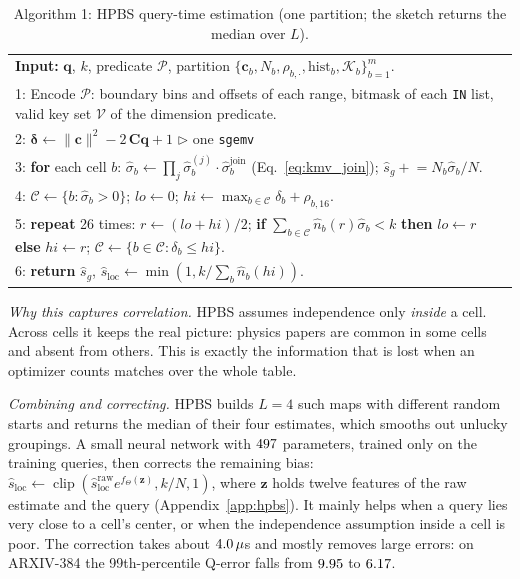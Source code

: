 \documentclass[sigconf,nonacm]{acmart}
\begin{document}
\begin{table}[!t]
\footnotesize
\centering
\caption{Algorithm 1: HPBS query-time estimation (one partition; the sketch returns the median over $L$).}
\label{alg:hpbs}
\begin{tabular}{p{}}
\toprule
\textbf{Input:} $\mathbf{q}$, $k$, predicate $\mathcal{P}$, partition $\{\mathbf{c}_b, N_b, \rho_{b,\cdot}, \text{hist}_b, \mathcal{K}_b\}_{b=1}^m$.\\
1: Encode $\mathcal{P}$: boundary bins and offsets of each range, bitmask of each \texttt{IN} list, valid key set $\mathcal{V}$ of the dimension predicate.\\
2: $\boldsymbol{\delta}\leftarrow \|\mathbf{c}\|^2 - 2\,\mathbf{C}\mathbf{q} + 1$ \hfill $\triangleright$ one \texttt{sgemv}\\
3: \textbf{for} each cell $b$: $\hat\sigma_b\leftarrow\prod_j\hat\sigma_b^{(j)}\cdot\hat\sigma_b^{\text{join}}$ (Eq.~\eqref{eq:kmv_join}); $\hat s_g \mathrel{+}= N_b\hat\sigma_b/N$.\\
4: $\mathcal{C}\leftarrow\{b:\hat\sigma_b>0\}$; $lo\leftarrow0$; $hi\leftarrow\max_{b\in\mathcal{C}}\delta_b+\rho_{b,16}$.\\
5: \textbf{repeat} 26 times: $r\leftarrow(lo+hi)/2$; \textbf{if} $\sum_{b\in\mathcal{C}}\hat n_b(r)\hat\sigma_b<k$ \textbf{then} $lo\leftarrow r$ \textbf{else} $hi\leftarrow r$; $\mathcal{C}\leftarrow\{b\in\mathcal{C}:\delta_b\le hi\}$.\\
6: \textbf{return} $\hat s_g$, $\hat s_{\text{loc}}\leftarrow\min(1, k/\sum_b\hat n_b(hi))$.\\
\bottomrule
\end{tabular}
\end{table}

\emph{Why this captures correlation.} HPBS assumes independence only \emph{inside} a cell. Across cells it keeps the real picture: physics papers are common in some cells and absent from others. This is exactly the information that is lost when an optimizer counts matches over the whole table.

\emph{Combining and correcting.} HPBS builds $L=4$ such maps with different random starts and returns the median of their four estimates, which smooths out unlucky groupings. A small neural network with $497$ parameters, trained only on the training queries, then corrects the remaining bias: $\hat s_{\text{loc}}\leftarrow\operatorname{clip}(\hat s^{\text{raw}}_{\text{loc}}e^{f_\Theta(\mathbf{z})},k/N,1)$, where $\mathbf{z}$ holds twelve features of the raw estimate and the query (Appendix~\ref{app:hpbs}). It mainly helps when a query lies very close to a cell's center, or when the independence assumption inside a cell is poor. The correction takes about $4.0\,\mu$s and mostly removes large errors: on ARXIV-384 the 99th-percentile Q-error falls from $9.95$ to $6.17$.
\end{document}
